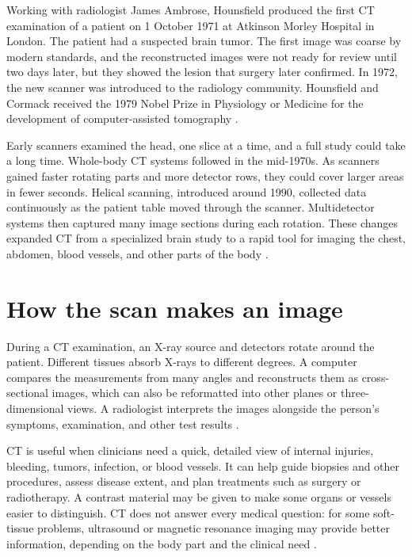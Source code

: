 \documentclass[12pt,oneside]{book}
\begin{document}
Working with radiologist James Ambrose, Hounsfield produced the first CT
examination of a patient on 1 October 1971 at Atkinson Morley Hospital in
London. The patient had a suspected brain tumor. The first image was coarse
by modern standards, and the reconstructed images were not ready for review
until two days later, but they showed the lesion that surgery later
confirmed. In 1972, the new
scanner was introduced to the radiology community. Hounsfield and Cormack
received the 1979 Nobel Prize in Physiology or Medicine for the development
of computer-assisted tomography \cite{ctMilestones}.

Early scanners examined the head, one slice at a time, and a full study
could take a long time. Whole-body CT systems followed in the mid-1970s.
As scanners gained faster rotating parts and more detector rows, they could
cover larger areas in fewer seconds. Helical scanning, introduced around
1990, collected data continuously as the patient table moved through the
scanner. Multidetector systems then captured many image sections during
each rotation. These changes expanded CT from a specialized brain study to
a rapid tool for imaging the chest, abdomen, blood vessels, and other parts
of the body \cite{ctMilestones}.

\section{How the scan makes an image}
During a CT examination, an X-ray source and detectors rotate around the
patient. Different tissues absorb X-rays to different degrees. A computer
compares the measurements from many angles and reconstructs them as
cross-sectional images, which can also be reformatted into other planes or
three-dimensional views. A radiologist interprets the images alongside the
person's symptoms, examination, and other test results
\cite{radiologyInfoBodyCT}.

CT is useful when clinicians need a quick, detailed view of internal
injuries, bleeding, tumors, infection, or blood vessels. It can help guide
biopsies and other procedures, assess disease extent, and plan treatments
such as surgery or radiotherapy. A contrast material may be given to make
some organs or vessels easier to distinguish. CT does not answer every
medical question: for some soft-tissue problems, ultrasound or magnetic
resonance imaging may provide better information, depending on the body
part and the clinical need \cite{radiologyInfoBodyCT}.
\end{document}
